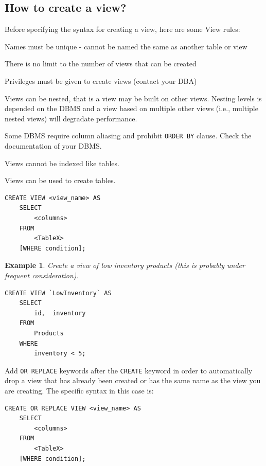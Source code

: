\documentclass{article}
\newtheorem{example}{Example}
\begin{document}
\subsection*{How to create a view?}
Before specifying the syntax for creating a view, here are some View rules: 


\begin{outline}
    \1 Names must be unique - cannot be named the same as another table or view 
    
    \1 There is no limit to the number of views that can be created 
    
    \1 Privileges must be given to create views (contact your DBA)
    
    \1 Views can be nested, that is a view may be built on other views.  Nesting levels is depended on the DBMS and a view based on multiple other views (i.e., multiple nested views) will degradate  performance.  
    
    \1 Some DBMS require column aliasing and prohibit \texttt{ORDER BY} clause.  Check the documentation of your DBMS.  
    
   \1 Views cannot be indexed like tables.  
   
   \1 Views can be used to create tables.  
    
      
\end{outline}


\begin{lstlisting}[frame=single]  
CREATE VIEW <view_name> AS 
	SELECT 
		<columns> 
	FROM 
		<TableX>
	[WHERE condition];
\end{lstlisting} 

  
  
 \begin{example}
 Create a view of low inventory products (this is probably under frequent consideration).
 \end{example}


\begin{lstlisting}[frame=single]  
CREATE VIEW `LowInventory` AS
    SELECT 
        id,  inventory
    FROM
        Products
    WHERE
        inventory < 5;
\end{lstlisting} 


\noindent Add \texttt{OR REPLACE} keywords after the \texttt{CREATE} keyword in order to automatically drop a view that has already been created or has the same name as the view you are creating.  The specific syntax in this case is:


\begin{lstlisting}[frame=single]  
CREATE OR REPLACE VIEW <view_name> AS 
	SELECT 
		<columns> 
	FROM 
		<TableX>
	[WHERE condition];
\end{lstlisting} 
\end{document}
